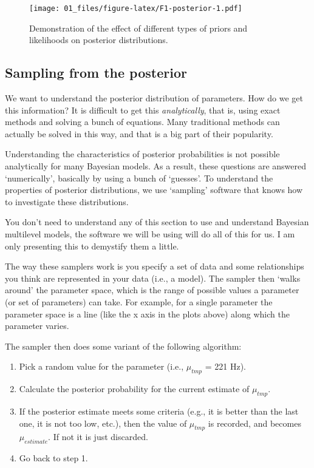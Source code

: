 \documentclass[
]{book}
\begin{document}
\begin{figure}
\centering
\texttt{[image: 01\_files/figure-latex/F1-posterior-1.pdf]}
\caption{\label{fig:F1-posterior}Demonstration of the effect of different types of priors and likelihoods on posterior distributions.}
\end{figure}

\hypertarget{sampling-from-the-posterior}{%
\subsection{Sampling from the posterior}\label{sampling-from-the-posterior}}

We want to understand the posterior distribution of parameters. How do we get this information? It is difficult to get this \emph{analytically}, that is, using exact methods and solving a bunch of equations. Many traditional methods can actually be solved in this way, and that is a big part of their popularity.

Understanding the characteristics of posterior probabilities is not possible analytically for many Bayesian models. As a result, these questions are answered `numerically', basically by using a bunch of `guesses'. To understand the properties of posterior distributions, we use `sampling' software that knows how to investigate these distributions.

You don't need to understand any of this section to use and understand Bayesian multilevel models, the software we will be using will do all of this for us. I am only presenting this to demystify them a little.

The way these samplers work is you specify a set of data and some relationships you think are represented in your data (i.e., a model). The sampler then `walks around' the parameter space, which is the range of possible values a parameter (or set of parameters) can take. For example, for a single parameter the parameter space is a line (like the x axis in the plots above) along which the parameter varies.

The sampler then does some variant of the following algorithm:

\begin{enumerate}
\def\labelenumi{\arabic{enumi})}
\item
  Pick a random value for the parameter (i.e., \(\mu_{tmp}\) = 221 Hz).
\item
  Calculate the posterior probability for the current estimate of \(\mu_{tmp}\).
\item
  If the posterior estimate meets some criteria (e.g., it is better than the last one, it is not too low, etc.), then the value of \(\mu_{tmp}\) is recorded, and becomes \(\mu_{estimate}\). If not it is just discarded.
\item
  Go back to step 1.
\end{enumerate}
\end{document}
